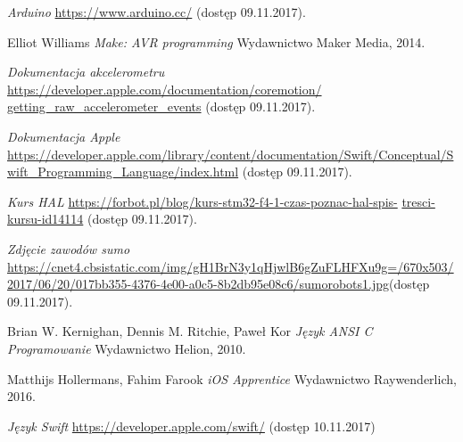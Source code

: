 \documentclass[a4paper,onecolumn,oneside,12pt,extrafontsizes]{memoir}
\begin{document}
\begin{thebibliography}{99}

	\emph{Arduino}
  \url{https://www.arduino.cc/}  
  (dostęp 09.11.2017).

	Elliot Williams
	\emph{Make: AVR programming}
  	Wydawnictwo Maker Media, 2014.

    \emph{Dokumentacja akcelerometru}
    \url{https://developer.apple.com/documentation/coremotion/               getting_raw_accelerometer_events}  
  (dostęp 09.11.2017).  

	\emph{Dokumentacja Apple}
     \url{https://developer.apple.com/library/content/documentation/Swift/Conceptual/Swift_Programming_Language/index.html}  
  (dostęp 09.11.2017).
    
	\emph{Kurs HAL}
  \url{https://forbot.pl/blog/kurs-stm32-f4-1-czas-poznac-hal-spis-}
  \url{tresci-kursu-id14114}  
  (dostęp 09.11.2017).
  
	\emph{Zdjęcie zawodów sumo}
  \url{https://cnet4.cbsistatic.com/img/gH1BrN3y1qHjwlB6gZuFLHFXu9g=/670x503/2017/06/20/017bb355-4376-4e00-a0c5-8b2db95e08c6/sumorobots1.jpg}(dostęp 09.11.2017).
  
        	    Brian W. Kernighan, Dennis M. Ritchie, Paweł Kor
	\emph{ Język ANSI C Programowanie}
	Wydawnictwo Helion, 2010.  
	
      Matthijs Hollermans, Fahim Farook
	\emph{iOS Apprentice}
	Wydawnictwo Raywenderlich, 2016.
	
	\emph{Język Swift}
	\url{https://developer.apple.com/swift/}
	(dostęp 10.11.2017)

\end{thebibliography}
\end{document}
